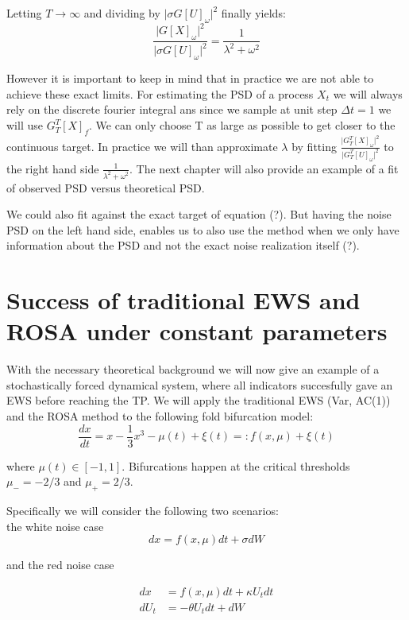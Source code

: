 \documentclass[%
thesis=student,%
coverpage=false,%
titlepage=false,%
headmarks=true, %
german,%
font=libertine, %
math=newpxtx, %
BCOR=5mm,%
coverBCOR=11mm%
]{tumbook}
\begin{document}
Letting $T \rightarrow \infty$ and dividing by $\lvert\sigma G[U]_{\omega}\rvert^2$ finally yields:
\[
    \frac{\lvert G[X]_{\omega} \rvert^2}{\lvert\sigma G[U]_{\omega}\rvert^2} = \frac{1}{\lambda^2 + \omega^2}
\]

However it is important to keep in mind that in practice we are not able to achieve these exact limits. For estimating the PSD of a process $X_{t}$ we will always rely on the discrete fourier integral ans since we sample at unit step $\Delta t = 1$ we will use $G_{T}^{T}[X]_{f}$. We can only choose T as large as possible to get closer to the continuous target. In practice we will than approximate $\lambda$ by fitting $\frac{\lvert G_{T}^{T}[X]_{\omega} \rvert ^2}{\lvert G_{T}^{T}[U]_{\omega} \rvert ^2}$ to the right hand side $\frac{1}{\lambda^2 + \omega^2}$. The next chapter will also provide an example of a fit of observed PSD versus theoretical PSD.


We could also fit against the exact target of equation (?). But having the noise PSD on the left hand side, enables us to also use the method when we only have information about the PSD and not the exact noise realization itself (?).



\chapter{Success of traditional EWS and ROSA under constant parameters}

With the necessary theoretical background we will now give an example of a stochastically forced dynamical system, where all indicators succesfully gave an EWS before reaching the TP.
We will apply the traditional EWS (Var, AC(1)) and the ROSA method to the following fold bifurcation model: 
        \[
            \frac{dx}{dt} = x - \frac{1}{3}x^3 - \mu(t) + \xi(t) =: f(x,\mu) + \xi(t)
        \]
        
where $\mu(t) \in [-1,1]$. Bifurcations happen at the critical thresholds $\mu_{-} = -2/3$ and $\mu_{+} = 2/3$.

Specifically we will consider the following two scenarios: \\
    the white noise case
    \[
    dx = f(x,\mu)dt + \sigma dW
    \]

and the red noise case
    
    \begin{align*}   
    dx & = f(x,\mu)dt + \kappa U_{t}dt \\
    dU_{t} & = -\theta U_{t} dt + dW
    \end{align*}
\end{document}
